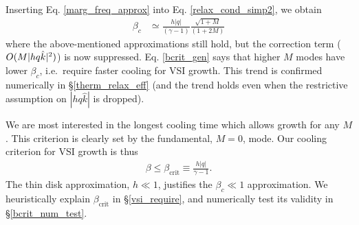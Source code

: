 Inserting Eq. \ref{marg_freq_approx} into
Eq. \ref{relax_cond_simp2}, we obtain 
\begin{align}\label{bcrit_gen}
  \beta_c &\simeq  \frac{h|q|}{(\gamma - 1)}
  \frac{\sqrt{1+M}}{(1+2M)} 
\end{align}
where the above-mentioned approximations still hold, but the correction term ($O(M |h q \hat{k}|^2)$) is now suppressed.
Eq. \ref{bcrit_gen} says that higher $M$ modes have lower $\beta_c$, i.e.\ require faster cooling for VSI growth.
This trend is confirmed numerically in \S\ref{therm_relax_eff} (and the trend holds even when the restrictive assumption
on $|h q \hat{k}|$ is dropped). 

We are most interested in the longest cooling time which allows growth for any $M$.  
This criterion is clearly set by the fundamental, $M = 0$, mode.  Our cooling criterion for 
VSI growth is thus 
 \begin{align}\label{iso_vsi_cond}
  \beta\leq \beta_\mathrm{crit}  \equiv
  \frac{h|q|}{\gamma-1} . 
\end{align}
The thin disk approximation, $h \ll 1$, justifies the $\beta_c \ll 1$ approximation.
 We heuristically explain $\beta_\mathrm{crit}$ in
\S\ref{vsi_require}, and numerically test its validity in \S\ref{bcrit_num_test}. 




